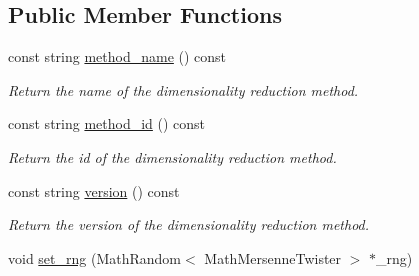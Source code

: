 \subsection*{Public Member Functions}
\begin{CompactItemize}
\item 
\hypertarget{class_y_a_a_t_e_reduce_a1}{
const string \hyperlink{class_y_a_a_t_e_reduce_a1}{method\_\-name} () const }
\label{class_y_a_a_t_e_reduce_a1}

\begin{CompactList}\small\item\em Return the name of the dimensionality reduction method. \item\end{CompactList}\item 
\hypertarget{class_y_a_a_t_e_reduce_a2}{
const string \hyperlink{class_y_a_a_t_e_reduce_a2}{method\_\-id} () const }
\label{class_y_a_a_t_e_reduce_a2}

\begin{CompactList}\small\item\em Return the id of the dimensionality reduction method. \item\end{CompactList}\item 
\hypertarget{class_y_a_a_t_e_reduce_a3}{
const string \hyperlink{class_y_a_a_t_e_reduce_a3}{version} () const }
\label{class_y_a_a_t_e_reduce_a3}

\begin{CompactList}\small\item\em Return the version of the dimensionality reduction method. \item\end{CompactList}\item 
\hypertarget{class_y_a_a_t_e_reduce_a4}{
void \hyperlink{class_y_a_a_t_e_reduce_a4}{set\_\-rng} (Math\-Random$<$ Math\-Mersenne\-Twister $>$ $\ast$\_\-rng)}
\label{class_y_a_a_t_e_reduce_a4}


\end{CompactItemize}

